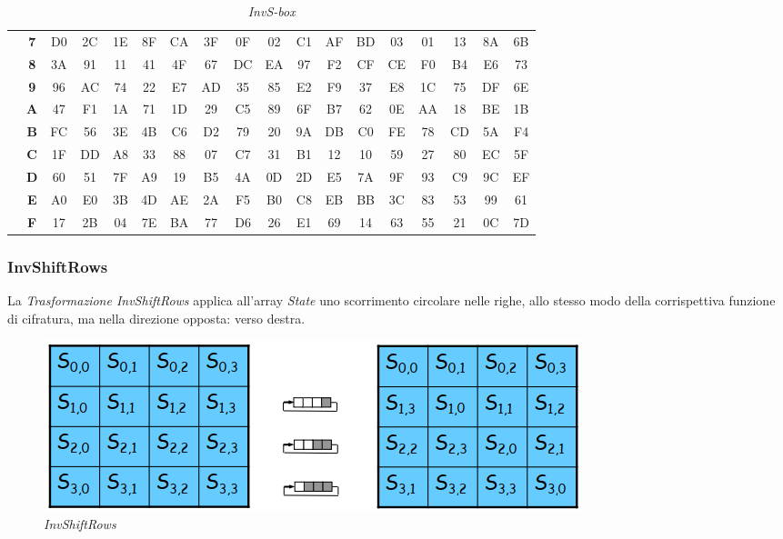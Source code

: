 \documentclass[a4paper,11pt]{article}
\begin{document}
\begin{table}[H]
{\begin{tabular}{@{}|c|c|*{16}{c|}}
        \\ \cline{2-18}
        & \cellcolor{gray!25}\textbf{7} & D0 & 2C & 1E & 8F & CA & 3F & 0F & 02 & C1 & AF & BD & 03 & 01 & 13 & 8A & 6B
        \\ \cline{2-18}
        & \cellcolor{gray!25}\textbf{8} & 3A & 91 & 11 & 41 & 4F & 67 & DC & EA & 97 & F2 & CF & CE & F0 & B4 & E6 & 73
        \\ \cline{2-18}
        & \cellcolor{gray!25}\textbf{9} & 96 & AC & 74 & 22 & E7 & AD & 35 & 85 & E2 & F9 & 37 & E8 & 1C & 75 & DF & 6E
        \\ \cline{2-18}
        & \cellcolor{gray!25}\textbf{A} & 47 & F1 & 1A & 71 & 1D & 29 & C5 & 89 & 6F & B7 & 62 & 0E & AA & 18 & BE & 1B
        \\ \cline{2-18}
        & \cellcolor{gray!25}\textbf{B} & FC & 56 & 3E & 4B & C6 & D2 & 79 & 20 & 9A & DB & C0 & FE & 78 & CD & 5A & F4
        \\ \cline{2-18}
        & \cellcolor{gray!25}\textbf{C} & 1F & DD & A8 & 33 & 88 & 07 & C7 & 31 & B1 & 12 & 10 & 59 & 27 & 80 & EC & 5F
        \\ \cline{2-18}
        & \cellcolor{gray!25}\textbf{D} & 60 & 51 & 7F & A9 & 19 & B5 & 4A & 0D & 2D & E5 & 7A & 9F & 93 & C9 & 9C & EF
        \\ \cline{2-18}
        & \cellcolor{gray!25}\textbf{E} & A0 & E0 & 3B & 4D & AE & 2A & F5 & B0 & C8 & EB & BB & 3C & 83 & 53 & 99 & 61
        \\ \cline{2-18}
        & \cellcolor{gray!25}\textbf{F} & 17 & 2B & 04 & 7E & BA & 77 & D6 & 26 & E1 & 69 & 14 & 63 & 55 & 21 & 0C & 7D
        \\ \cline{2-18}
        \hline
    \end{tabular}}
    \caption{\textit{InvS-box}}
\end{table}

\subsubsection{InvShiftRows}
La \textit{Trasformazione InvShiftRows} applica all'array \textit{State} uno scorrimento circolare nelle righe, allo stesso modo della corrispettiva funzione di cifratura, ma nella direzione opposta: verso destra.
\begin{figure}[H]
    \centering
    \includegraphics[scale=0.5]{invshiftrows}
    \caption{\textit{InvShiftRows}}
\end{figure}
\end{document}
